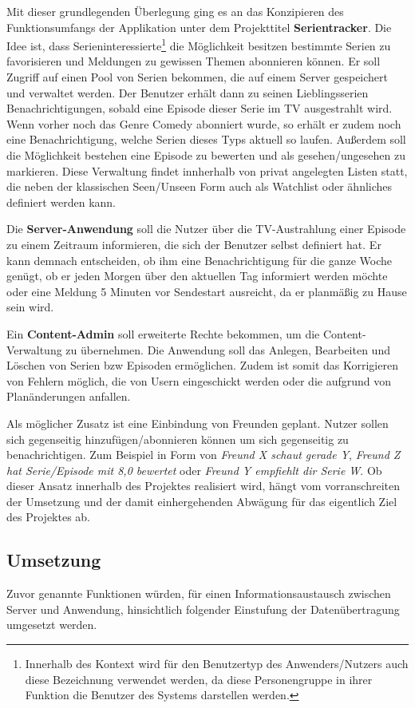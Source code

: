 \documentclass[a4paper]{article}
\begin{document}
\parskip 12pt
\parindent 0pt
Mit dieser grundlegenden Überlegung ging es an das Konzipieren des Funktionsumfangs der Applikation unter dem Projekttitel \textbf{Serientracker}.
Die Idee ist, dass Serieninteressierte\footnote[1]{Innerhalb des Kontext wird für den Benutzertyp des Anwenders/Nutzers auch diese Bezeichnung verwendet werden, da diese Personengruppe in ihrer Funktion die Benutzer des Systems darstellen werden.} die Möglichkeit besitzen bestimmte Serien zu favorisieren und Meldungen zu gewissen Themen abonnieren können. Er soll Zugriff auf einen Pool von Serien bekommen, die auf einem Server gespeichert und verwaltet werden. Der Benutzer erhält dann zu seinen Lieblingsserien Benachrichtigungen, sobald eine Episode dieser Serie im TV ausgestrahlt wird. Wenn vorher noch das Genre Comedy abonniert wurde, so erhält er zudem noch eine Benachrichtigung, welche Serien dieses Typs aktuell so laufen.
Außerdem soll die Möglichkeit bestehen eine Episode zu bewerten und als gesehen/ungesehen zu markieren. Diese Verwaltung findet innherhalb von privat angelegten Listen statt, die neben der klassischen Seen/Unseen Form auch als Watchlist oder ähnliches definiert werden kann.

\newpage
Die \textbf{Server-Anwendung} soll die Nutzer über die TV-Austrahlung einer Episode zu einem Zeitraum informieren, die sich der Benutzer selbst definiert hat. Er kann demnach entscheiden, ob ihm eine Benachrichtigung für die ganze Woche genügt, ob er jeden Morgen über den aktuellen Tag informiert werden möchte oder eine Meldung 5 Minuten vor Sendestart ausreicht, da er planmäßig zu Hause sein wird.

\parskip 12pt
\parindent 0pt
Ein \textbf{Content-Admin} soll erweiterte Rechte bekommen, um die Content-Verwaltung zu übernehmen. Die Anwendung soll das Anlegen, Bearbeiten und Löschen von Serien bzw Episoden ermöglichen. Zudem ist somit das Korrigieren von Fehlern möglich, die von Usern eingeschickt werden oder die aufgrund von Planänderungen anfallen.

Als möglicher Zusatz ist eine Einbindung von Freunden geplant. Nutzer sollen sich gegenseitig hinzufügen/abonnieren können um sich gegenseitig zu benachrichtigen. Zum Beispiel in Form von \textit{Freund X schaut gerade Y}, \textit{Freund Z hat Serie/Episode mit 8,0 bewertet} oder \textit{Freund Y empfiehlt dir Serie W}. Ob dieser Ansatz innerhalb des Projektes realisiert wird, hängt vom vorranschreiten der Umsetzung  und der damit einhergehenden Abwägung für das eigentlich Ziel des Projektes ab.
\subsection{Umsetzung}
Zuvor genannte Funktionen würden, für einen Informationsaustausch zwischen Server und Anwendung, hinsichtlich folgender Einstufung der Datenübertragung umgesetzt werden.
\end{document}
